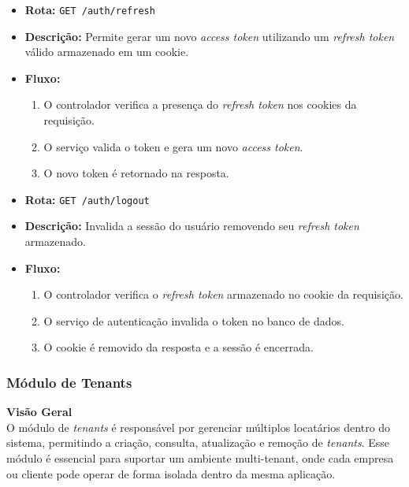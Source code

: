 \begin{itemize}
	\item \textbf{Rota:} \texttt{GET /auth/refresh}
	\item \textbf{Descrição:} Permite gerar um novo \textit{access token} utilizando um \textit{refresh token} válido armazenado em um cookie.
	\item \textbf{Fluxo:}
	\begin{enumerate}
		\item O controlador verifica a presença do \textit{refresh token} nos cookies da requisição.
		\item O serviço valida o token e gera um novo \textit{access token}.
		\item O novo token é retornado na resposta.
	\end{enumerate}
\end{itemize}

\begin{itemize}
	\item \textbf{Rota:} \texttt{GET /auth/logout}
	\item \textbf{Descrição:} Invalida a sessão do usuário removendo seu \textit{refresh token} armazenado.
	\item \textbf{Fluxo:}
	\begin{enumerate}
		\item O controlador verifica o \textit{refresh token} armazenado no cookie da requisição.
		\item O serviço de autenticação invalida o token no banco de dados.
		\item O cookie é removido da resposta e a sessão é encerrada.
	\end{enumerate}
\end{itemize}

\subsubsection{Módulo de Tenants}\label{subsubsec:modulo_tenants}

\noindent\textbf{Visão Geral} \\
O módulo de \textit{tenants} é responsável por gerenciar múltiplos locatários dentro do sistema, permitindo a criação, consulta, atualização e remoção de \textit{tenants}. Esse módulo é essencial para suportar um ambiente multi-tenant, onde cada empresa ou cliente pode operar de forma isolada dentro da mesma aplicação.

